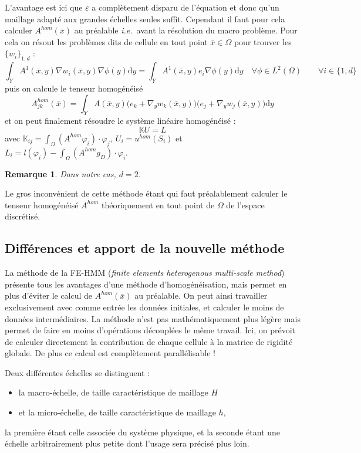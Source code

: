 \documentclass[11pt]{article}
\newtheorem{rmq}{Remarque}
\newcommand{\K}{\mathbb{K}}
\newcommand{\Ah}{A^{hom}}
\newcommand{\uh}{u^{hom}}
\newcommand{\bx}{\bar{x}}
\newcommand{\ie}{\emph{i.e.{}}~}
\newcommand{\td}{\text{d}}
\begin{document}
L'avantage est ici que $\varepsilon$ a complètement disparu de l'équation et donc qu'un
maillage adapté aux grandes échelles seules suffit. Cependant il faut pour cela calculer $\Ah(\bx)$ au préalable \ie avant la résolution du macro
problème. Pour cela on résout les problèmes dits de cellule en tout point $\bx \in \Omega$ pour trouver les $\{w_i\}_{1, d}$ : 
\begin{equation}
  \label{eq:cell}
  \int_Y A^1(\bx, y) \nabla w_i(\bx, y) \nabla \phi(y) \td y  = \int_Y A^1(\bx, y) e_i \nabla \phi(y) \td y
  \quad  \forall\phi\in L^2(\Omega) \qquad \forall i \in \{1, d\} 
\end{equation}
puis on calcule le tenseur homogénéisé
\begin{equation}
  \label{eq:Ahom}
  \Ah_{jk}(\bx) = \int_Y A(\bx, y)\big(e_k+\nabla_y w_k(\bx, y)\big)\big(e_j+\nabla_y w_j(\bx, y)\big) \td y 
\end{equation}
et on peut finalement résoudre le système linéaire homogénéisé :
\[
  \K U = L
\]
avec $\K_{ij} = \int_\Omega (\Ah \varphi_i)\cdot \varphi_j, ~ U_i = \uh(S_i)$ et $L_i = l(\varphi_i) - \int_\Omega (\Ah g_D)\cdot \varphi_i$.
\begin{rmq}
  Dans notre cas, $d=2$.
\end{rmq}
Le gros inconvénient de cette méthode étant qui faut préalablement calculer le tenseur homogénéisé $\Ah$ théoriquement en tout point de $\Omega$ de
l'espace discrétisé.


\subsection{Différences et apport de la nouvelle méthode}

La méthode de la FE-HMM (\emph{finite elements heterogenous multi-scale method}) présente tous les avantages d'une méthode d'homogénéisation, mais
permet en plus d'éviter le calcul de $\Ah(\bx)$ au préalable. On peut ainsi travailler exclusivement avec comme entrée les données initiales, et
calculer le moins de données intermédiaires. La méthode n'est pas mathématiquement plus légère mais permet de faire en moins d'opérations découplées
le même travail. Ici, on prévoit de calculer directement la contribution de chaque cellule à la matrice de rigidité globale. De plus ce calcul est
complètement parallélisable !

Deux différentes échelles se distinguent :
\begin{itemize}
\item la macro-échelle, de taille caractéristique de maillage $H$
\item et la micro-échelle, de taille caractéristique de maillage $h$,
\end{itemize}
la première étant celle associée du système physique, et la seconde étant une échelle arbitrairement plus petite dont l'usage sera précisé plus loin.
\end{document}

